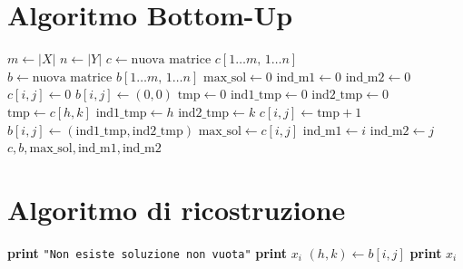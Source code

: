 \section{Algoritmo Bottom-Up}
\begin{algorithm}[htbp]
\caption{Calcolo Bottom-Up per LDCS}
\begin{algorithmic}[1]
    \State $m \gets |X|$
    \State $n \gets |Y|$
    \State $c \gets \text{nuova matrice } c[1 \dots m, \, 1 \dots n]$
    \State $b \gets \text{nuova matrice } b[1 \dots m, \, 1 \dots n]$
    \State $\text{max\_sol} \gets 0$
    \State $\text{ind\_m1} \gets 0$
    \State $\text{ind\_m2} \gets 0$
                \State $c[i, j] \gets 0$
                \State $b[i, j] \gets (0, 0)$
            \Else
                \State $\text{tmp} \gets 0$
                \State $\text{ind1\_tmp} \gets 0$
                \State $\text{ind2\_tmp} \gets 0$
                            \State $\text{tmp} \gets c[h, k]$
                            \State $\text{ind1\_tmp} \gets h$
                            \State $\text{ind2\_tmp} \gets k$
                        \EndIf
                    \EndFor
                \EndFor
                \State $c[i, j] \gets \text{tmp} + 1$
                \State $b[i, j] \gets (\text{ind1\_tmp}, \text{ind2\_tmp})$
                    \State $\text{max\_sol} \gets c[i, j]$
                    \State $\text{ind\_m1} \gets i$
                    \State $\text{ind\_m2} \gets j$
                \EndIf
            \EndIf
        \EndFor
    \EndFor
    \State \Return $c, b, \text{max\_sol}, \text{ind\_m1}, \text{ind\_m2}$
\EndProcedure
\end{algorithmic}
\end{algorithm}

\section{Algoritmo di ricostruzione}
\begin{algorithm}[htbp]
\caption{Ricostruzione della sequenza LDCS}
\begin{algorithmic}[1]
        \State \textbf{print} \texttt{"Non esiste soluzione non vuota"}
        \State \Return
    \Else
            \State \textbf{print} $x_i$
            \State \Return
        \Else
            \State $(h, k) \gets b[i, j]$
            \State {}
            \State \textbf{print} $x_i$
        \EndIf
    \EndIf
\EndProcedure
\end{algorithmic}
\end{algorithm}

